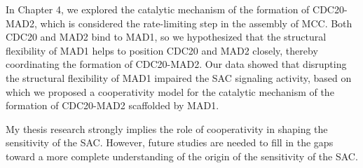 In Chapter 4, we explored the catalytic mechanism of the formation of CDC20-MAD2, which is considered the rate-limiting step in the assembly of MCC. Both CDC20 and MAD2 bind to MAD1, so we hypothesized that the structural flexibility of MAD1 helps to position CDC20 and MAD2 closely, thereby coordinating the formation of CDC20-MAD2. Our data showed that disrupting the structural flexibility of MAD1 impaired the SAC signaling activity, based on which we proposed a cooperativity model for the catalytic mechanism of the formation of CDC20-MAD2 scaffolded by MAD1.

My thesis research strongly implies the role of cooperativity in shaping the sensitivity of the SAC. However, future studies are needed to fill in the gaps toward a more complete understanding of the origin of the sensitivity of the SAC.